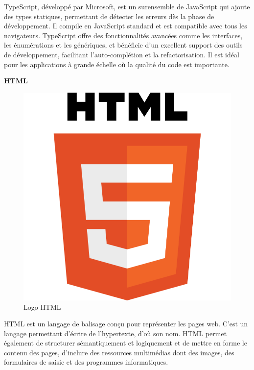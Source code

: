 TypeScript, développé par Microsoft, est un surensemble de 
JavaScript qui ajoute des types statiques, permettant de détecter 
les erreurs dès la phase de développement. Il compile en JavaScript 
standard et est compatible avec tous les navigateurs. 
TypeScript offre des fonctionnalités avancées comme les 
interfaces, les énumérations et les génériques, et bénéficie 
d'un excellent support des outils de développement, facilitant 
l'auto-complétion et la refactorisation. Il est idéal pour les 
applications à grande échelle où la qualité du code est importante.
\newline

\large
\textbf{HTML}
\begin{figure}[htbp]
   \centering
   \includegraphics[scale=0.2]{Images/html.png} 
   \caption{Logo HTML}
   \label{fig:html}
\end{figure}

HTML est un langage de balisage conçu pour représenter les pages
 web. C’est un langage permettant d’écrire de l’hypertexte, 
 d’où son nom. HTML permet également de structurer sémantiquement 
 et logiquement et de mettre en forme le contenu des pages, 
 d’inclure des ressources multimédias dont des images, des 
 formulaires de saisie et des programmes informatiques.

 

